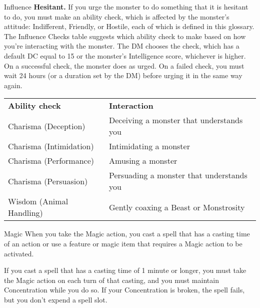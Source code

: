 \begin{Card}[2 of 2, Action]{Influence}
\textbf{Hesitant.} If you urge the monster to do something that it is hesitant to do, you must make an ability check, which is affected by the monster's attitude: Indifferent, Friendly, or Hostile, each of which is defined in this glossary. The Influence Checks table suggests which ability check to make based on how you're interacting with the monster. The DM chooses the check, which has a default DC equal to 15 or the monster's Intelligence score, whichever is higher. On a successful check, the monster does as urged. On a failed check, you must wait 24 hours (or a duration set by the DM) before urging it in the same way again.

\begin{tabular}{ll}
\textbf{Ability check}    & \textbf{Interaction} \\
Charisma (Deception)      &  Deceiving a monster that understands you \\
Charisma (Intimidation)   & Intimidating a monster \\
Charisma (Performance)    & Amusing a monster \\
Charisma (Persuasion)     & Persuading a monster that understands you \\
Wisdom (Animal Handling)  & Gently coaxing a Beast or Monstrosity
\end{tabular}
\end{Card}


\begin{Card}[Action]{Magic}
When you take the Magic action, you cast a spell that has a casting time of an action or use a feature or magic item that requires a Magic action to be activated.

If you cast a spell that has a casting time of 1 minute or longer, you must take the Magic action on each turn of that casting, and you must maintain Concentration while you do so. If your Concentration is broken, the spell fails, but you don't expend a spell slot.
\end{Card}


